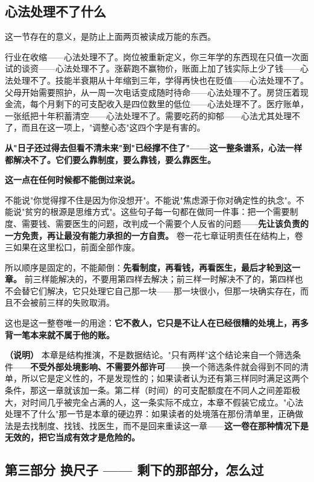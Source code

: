 \documentclass[11pt,a4paper]{ctexart}
\begin{document}
\subsection{心法处理不了什么}

这一节存在的意义，是防止上面两页被读成万能的东西。

行业在收缩——心法处理不了。岗位被重新定义，你三年学的东西现在只值一次面试的谈资——心法处理不了。涨薪跑不赢物价，账面上加了钱实际上少了钱——心法处理不了。技能半衰期从十年缩到三年，学得再快也在贬值——心法处理不了。父母开始需要照护，从一周一次电话变成随时待命——心法处理不了。房贷压着现金流，每个月剩下的可支配收入是四位数里的低位——心法处理不了。医疗账单，一张纸把十年积蓄清空——心法处理不了。需要吃药的抑郁——心法尤其处理不了，而且在这一项上，"调整心态"这四个字是有害的。

\textbf{从"日子还过得去但看不清未来"到"已经撑不住了"——这一整条谱系，心法一样都解决不了。它们要么靠制度，要么靠钱，要么靠医生。}

\textbf{这一点在任何时候都不能倒过来说。}

不能说"你觉得撑不住是因为你没想开"。不能说"焦虑源于你对确定性的执念"。不能说"贫穷的根源是思维方式"。这些句子每一句都在做同一件事：把一个需要制度、需要钱、需要医生的问题，改判成一个需要个人反省的问题——\textbf{先让该负责的一方免责，再让最没有能力承担的一方自责。} 卷一花七章证明责任在结构上，卷三如果在这里松口，前面全部作废。

所以顺序是固定的，不能颠倒：\textbf{先看制度，再看钱，再看医生，最后才轮到这一章。} 前三样能解决的，不要用第四样去解决；前三样一时解决不了的，第四样也不会替它们解决，它只处理它自己那一块——那一块很小，但那一块确实存在，而且不会被前三样的失败取消。

这也是这一整卷唯一的用途：\textbf{它不救人，它只是不让人在已经很糟的处境上，再多背一笔本来就不属于他的账。}

\textbf{（说明）} 本章是结构推演，不是数据结论。"只有两样"这个结论来自一个筛选条件——\textbf{不受外部处境影响、不需要外部许可}——换一个筛选条件就会得到不同的清单，所以它是定义性的，不是发现性的；如果读者认为还有第三样同时满足这两个条件，那这一章就该加一条。第二样（时间）的可支配额度在不同人之间差距极大，对时间几乎被完全占满的人，这一条实际不成立，本章不假装它成立。"心法处理不了什么"那一节是本章的硬边界：如果读者的处境落在那份清单里，正确做法是去找制度、找钱、找医生，而不是回来重读这一章——\textbf{这一卷在那种情况下是无效的，把它当成有效才是危险的。}

\subsection{第三部分 \textperiodcentered{} 换尺子 —— 剩下的那部分，怎么过}
\end{document}
